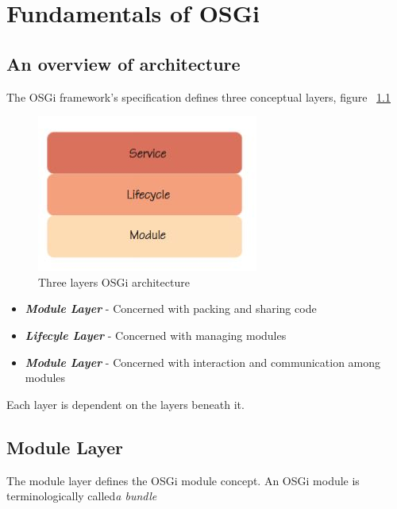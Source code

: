 \chapter{Fundamentals of OSGi}

\section{An overview of architecture}
The OSGi framework's specification defines three conceptual layers, figure ~\ref{fig:layers}
\begin{figure}
	\centering
		\includegraphics{image/layers.JPG}
	\caption{Three layers OSGi architecture }
	\label{fig:layers}
\end{figure}
 
\begin{itemize}
	\item \textbf{\textit{Module Layer}} - Concerned with packing and sharing code
	\item \textbf{\textit{Lifecyle Layer}} - Concerned with managing modules
	\item \textbf{\textit{Module Layer}} - Concerned with interaction and communication among modules
\end{itemize}
Each layer is dependent on the layers beneath it.
\section{Module Layer}
The module layer defines the OSGi module concept. An OSGi module is terminologically called\textit{a bundle}
